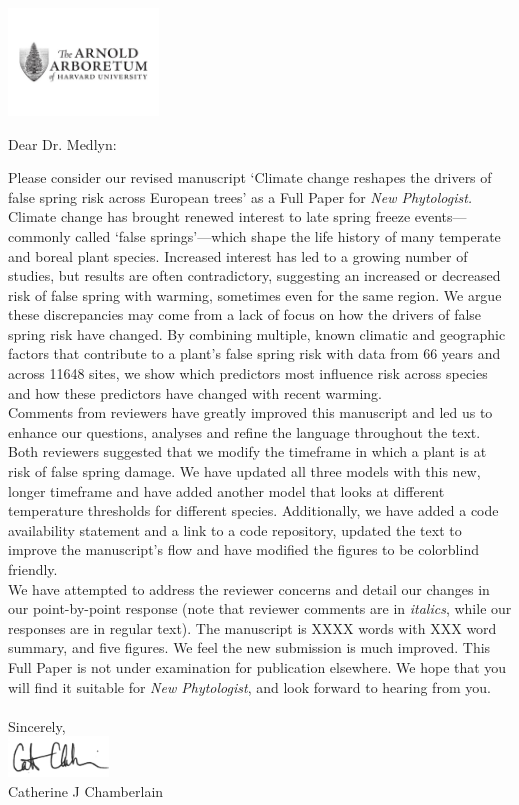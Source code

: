 \documentclass[11pt,a4paper]{letter}\usepackage[]{graphicx}\usepackage[]{color}
\begin{document}
\begin{letter}{}
\includegraphics[width=0.3\textwidth]{AA_logo.jpg}

\opening{Dear Dr. Medlyn:}

\noindent Please consider our revised manuscript `Climate change reshapes the drivers of false spring risk across European trees' as a Full Paper for \emph{New Phytologist.} 
\vspace{1.5ex}\\
Climate change has brought renewed interest to late spring freeze events---commonly called `false springs'---which shape the life history of many temperate and boreal plant species. Increased interest has led to a growing number of studies, but results are often contradictory, suggesting an increased or decreased risk of false spring with warming, sometimes even for the same region. We argue these discrepancies may come from a lack of focus on how the drivers of false spring risk have changed. By combining multiple, known climatic and geographic factors that contribute to a plant's false spring risk with data from 66 years and across 11648 sites, we show which predictors most influence risk across species and how these predictors have changed with recent warming.
\vspace{1.5ex}\\
Comments from reviewers have greatly improved this manuscript and led us to enhance our questions, analyses and refine the language throughout the text. Both reviewers suggested that we modify the timeframe in which a plant is at risk of false spring damage. We have updated all three models with this new, longer timeframe and have added another model that looks at different temperature thresholds for different species.  Additionally, we have added a code availability statement and a link to a code repository, updated the text to improve the manuscript's flow and have modified the figures to be colorblind friendly. 
\vspace{1.5ex}\\
We have attempted to address the reviewer concerns and detail our changes in our point-by-point response (note that reviewer comments are in \emph{italics}, while our responses are in regular text). The manuscript is XXXX words with XXX word summary, and five figures. We feel the new submission is much improved. This Full Paper is not under examination for publication elsewhere. We hope that you will find it suitable for \emph{New Phytologist}, and look forward to hearing from you.
\\\vspace{-1ex}\\
\noindent Sincerely,\\

 \includegraphics[width=0.2\textwidth]{Full_Signature.jpg} \\
 

\noindent Catherine J Chamberlain


\end{letter}
\end{document}
